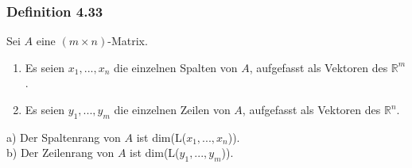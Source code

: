 \documentclass{article}
\begin{document}
\subsubsection*{Definition 4.33}
Sei $A$ eine $(m \times n)$-Matrix. 
\begin{enumerate}
    \item Es seien $x_1,...,x_n$ die einzelnen Spalten von $A$, aufgefasst als Vektoren des $\mathbb{R}^m$. 
    \item Es seien $y_1,...,y_m$ die einzelnen Zeilen von $A$, aufgefasst als Vektoren des $\mathbb{R}^n$. \\
\end{enumerate}
a) Der Spaltenrang von $A$ ist dim(L($x_1,...,x_n$)). \\
b) Der Zeilenrang von $A$ ist dim(L($y_1,...,y_m$)). \\
\\
\end{document}
